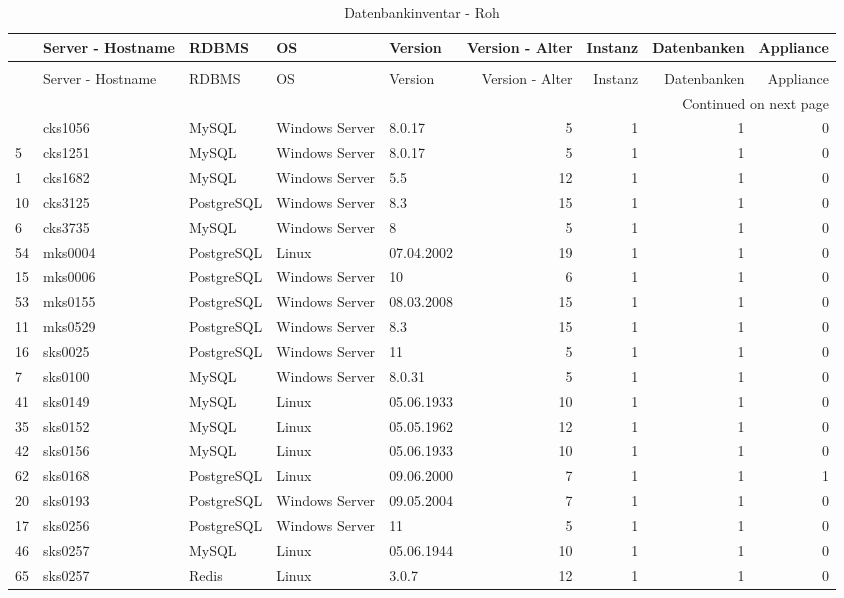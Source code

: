 \begin{longtable}[H]{lllllrrrr}

\toprule
 & Server - Hostname & RDBMS & OS & Version & Version - Alter & Instanz & Datenbanken & Appliance \\
\midrule
\endfirsthead
\caption[]{Datenbankinventar - Roh} \\
\toprule
 & Server - Hostname & RDBMS & OS & Version & Version - Alter & Instanz & Datenbanken & Appliance \\
\midrule
\endhead
\midrule
\multicolumn{9}{r}{Continued on next page} \\
\midrule
\endfoot
\bottomrule
\endlastfoot
4 & cks1056 & MySQL & Windows Server & 8.0.17 & 5 & 1 & 1 & 0 \\
5 & cks1251 & MySQL & Windows Server & 8.0.17 & 5 & 1 & 1 & 0 \\
1 & cks1682 & MySQL & Windows Server & 5.5 & 12 & 1 & 1 & 0 \\
10 & cks3125 & PostgreSQL & Windows Server & 8.3 & 15 & 1 & 1 & 0 \\
6 & cks3735 & MySQL & Windows Server & 8 & 5 & 1 & 1 & 0 \\
54 & mks0004 & PostgreSQL & Linux & 07.04.2002 & 19 & 1 & 1 & 0 \\
15 & mks0006 & PostgreSQL & Windows Server & 10 & 6 & 1 & 1 & 0 \\
53 & mks0155 & PostgreSQL & Windows Server & 08.03.2008 & 15 & 1 & 1 & 0 \\
11 & mks0529 & PostgreSQL & Windows Server & 8.3 & 15 & 1 & 1 & 0 \\
16 & sks0025 & PostgreSQL & Windows Server & 11 & 5 & 1 & 1 & 0 \\
7 & sks0100 & MySQL & Windows Server & 8.0.31 & 5 & 1 & 1 & 0 \\
41 & sks0149 & MySQL & Linux & 05.06.1933 & 10 & 1 & 1 & 0 \\
35 & sks0152 & MySQL & Linux & 05.05.1962 & 12 & 1 & 1 & 0 \\
42 & sks0156 & MySQL & Linux & 05.06.1933 & 10 & 1 & 1 & 0 \\
62 & sks0168 & PostgreSQL & Linux & 09.06.2000 & 7 & 1 & 1 & 1 \\
20 & sks0193 & PostgreSQL & Windows Server & 09.05.2004 & 7 & 1 & 1 & 0 \\
17 & sks0256 & PostgreSQL & Windows Server & 11 & 5 & 1 & 1 & 0 \\
46 & sks0257 & MySQL & Linux & 05.06.1944 & 10 & 1 & 1 & 0 \\
65 & sks0257 & Redis & Linux & 3.0.7 & 12 & 1 & 1 & 0 \\

\end{longtable}
